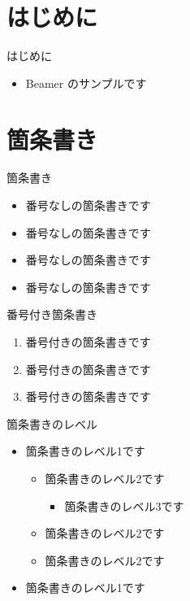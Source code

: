 \section{はじめに}

\begin{frame}{はじめに}
  \begin{itemize}
    \item Beamer のサンプルです
  \end{itemize}
\end{frame}

\section{箇条書き}

\begin{frame}{箇条書き}
  \begin{itemize}
    \item 番号なしの箇条書きです
    \item 番号なしの箇条書きです
    \item 番号なしの箇条書きです
    \item 番号なしの箇条書きです
  \end{itemize}
\end{frame}

\begin{frame}{番号付き箇条書き}
  \begin{enumerate}
    \item 番号付きの箇条書きです
    \item 番号付きの箇条書きです
    \item 番号付きの箇条書きです
  \end{enumerate}
\end{frame}

\begin{frame}{箇条書きのレベル}
  \begin{itemize}
    \item 箇条書きのレベル1です
    \begin{itemize}
      \item 箇条書きのレベル2です
      \begin{itemize}
        \item 箇条書きのレベル3です
      \end{itemize}
      \item 箇条書きのレベル2です
      \item 箇条書きのレベル2です
    \end{itemize}
    \item 箇条書きのレベル1です
  \end{itemize}
\end{frame}


